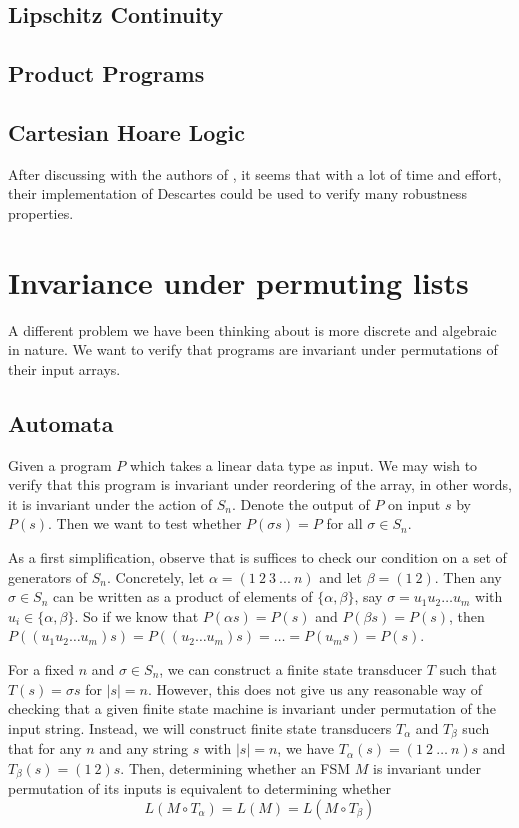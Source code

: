 \documentclass{llncs}
\begin{document}
\subsection{Lipschitz Continuity}

\subsection{Product Programs}

\subsection{Cartesian Hoare Logic}

After discussing with the authors of \cite{sousa16}, it seems that with a lot of
time and effort, their implementation of Descartes could be used to verify many
robustness properties.

\section{Invariance under permuting lists}
\label{permlists}

A different problem we have been thinking about is more discrete
and algebraic in nature.
We want to verify that programs are invariant under
permutations of their input arrays.

\subsection{Automata}
Given a program $P$ which takes a linear data type
as input. We may wish to verify that this program
is invariant under reordering of the array,
in other words, it is invariant under the action of $S_n$.
Denote the output of $P$ on input $s$ by $P(s)$.
Then we want to test whether $P(\sigma s) = P$
for all $\sigma \in S_n$.

As a first simplification, observe that is
suffices to check our condition on a set
of generators of $S_n$.
Concretely, let $\alpha = (1\ 2\ 3\ ...\ n)$
and let $\beta = (1\ 2)$.
Then any $\sigma \in S_n$ can be written as
a product of elements of $\{\alpha,\beta\}$,
say $\sigma = u_1 u_2\ldots u_m$ with
$u_i \in \{\alpha,\beta\}$.
So if we know that $P(\alpha s) = P(s)$
and $P(\beta s) = P(s)$, then
$P((u_1 u_2 \ldots u_m)s)
= P((u_2 \ldots u_m)s)
= \ldots = P(u_ms) = P(s) $.

For a fixed $n$ and $\sigma \in S_n$,
we can construct a finite state transducer
$T$ such that $T(s) = \sigma s$ for $|s|=n$.
However, this does not give us any
reasonable way of checking that a given
finite state machine is invariant under permutation
of the input string.
Instead, we will construct finite state
transducers $T_{\alpha}$ and $T_{\beta}$
such that for any $n$ and any string $s$
with $|s|=n$, we have
$T_{\alpha}(s)=(1\ 2\ \ldots\ n) s$ and
$T_{\beta}(s) = (1\ 2) s$.
Then, determining whether an FSM $M$ is
invariant under permutation of its inputs
is equivalent to determining whether
\[
  L(M \circ T_\alpha) = L(M) = L(M \circ T_\beta)
\]
\end{document}
